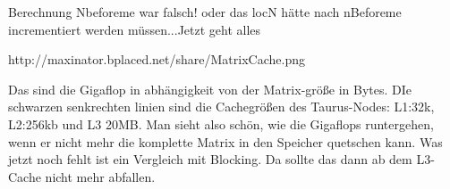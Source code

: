 \documentclass[12pt,a4paper]{article}
\begin{document}
Berechnung Nbeforeme war falsch! oder das locN hätte nach nBeforeme incrementiert werden müssen...Jetzt geht alles


http://maxinator.bplaced.net/share/MatrixCache.png

Das sind die Gigaflop in abhängigkeit von der Matrix-größe in Bytes. DIe schwarzen senkrechten linien sind die Cachegrößen des Taurus-Nodes: L1:32k, L2:256kb und L3 20MB. Man sieht also schön, wie die Gigaflops runtergehen, wenn er nicht mehr die komplette Matrix in den Speicher quetschen kann. Was jetzt noch fehlt ist ein Vergleich mit Blocking. Da sollte das dann ab dem L3-Cache nicht mehr abfallen.


\newpage

\printbibliography
\end{document}
